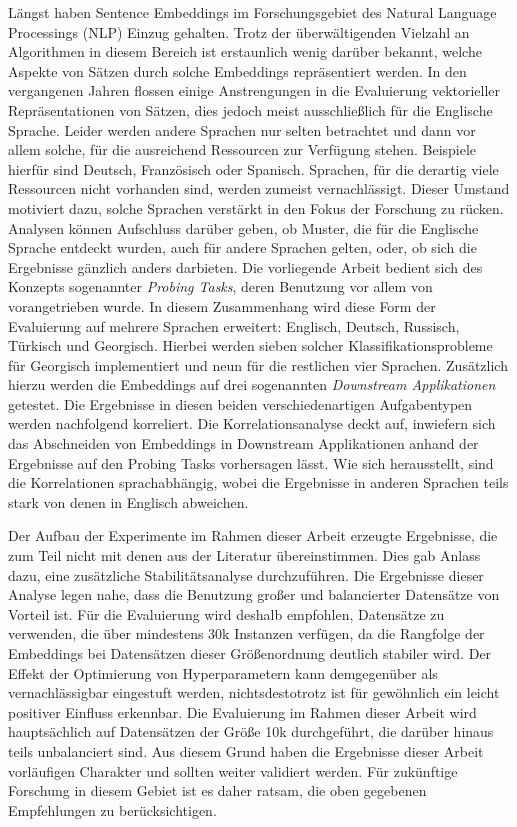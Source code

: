 Längst haben Sentence Embeddings im Forschungsgebiet des Natural Language Processings (NLP) Einzug gehalten. Trotz der überwältigenden Vielzahl an Algorithmen in diesem Bereich ist erstaunlich wenig darüber bekannt, welche Aspekte von Sätzen durch solche Embeddings repräsentiert werden. In den vergangenen Jahren flossen einige Anstrengungen in die Evaluierung vektorieller Repräsentationen von Sätzen, dies jedoch meist ausschließlich für die Englische Sprache. Leider werden andere Sprachen nur selten betrachtet und dann vor allem solche, für die ausreichend Ressourcen zur Verfügung stehen. Beispiele hierfür sind Deutsch, Französisch oder Spanisch. Sprachen, für die derartig viele Ressourcen nicht vorhanden sind, werden zumeist vernachlässigt. Dieser Umstand motiviert dazu, solche Sprachen verstärkt in den Fokus der Forschung zu rücken. Analysen können Aufschluss darüber geben, ob Muster, die für die Englische Sprache entdeckt wurden, auch für andere Sprachen gelten, oder, ob sich die Ergebnisse gänzlich anders darbieten. Die vorliegende Arbeit bedient sich des Konzepts sogenannter \textit{Probing Tasks}, deren Benutzung vor allem von \citep{Conneau.2018a} vorangetrieben wurde. In diesem Zusammenhang wird diese Form der Evaluierung auf mehrere Sprachen erweitert: Englisch, Deutsch, Russisch, Türkisch und Georgisch. Hierbei werden sieben solcher Klassifikationsprobleme für Georgisch implementiert und neun für die restlichen vier Sprachen. Zusätzlich hierzu werden die Embeddings auf drei sogenannten \textit{Downstream Applikationen} getestet. Die Ergebnisse in diesen beiden verschiedenartigen Aufgabentypen werden nachfolgend korreliert. Die Korrelationsanalyse deckt auf, inwiefern sich das Abschneiden von Embeddings in Downstream Applikationen anhand der Ergebnisse auf den Probing Tasks vorhersagen lässt. Wie sich herausstellt, sind die Korrelationen sprachabhängig, wobei die Ergebnisse in anderen Sprachen teils stark von denen in Englisch abweichen.

Der Aufbau der Experimente im Rahmen dieser Arbeit erzeugte Ergebnisse, die zum Teil nicht mit denen aus der Literatur übereinstimmen. Dies gab Anlass dazu, eine zusätzliche Stabilitätsanalyse durchzuführen. Die Ergebnisse dieser Analyse legen nahe, dass die Benutzung großer und balancierter Datensätze von Vorteil ist. Für die Evaluierung wird deshalb empfohlen, Datensätze zu verwenden, die über mindestens 30k Instanzen verfügen, da die Rangfolge der Embeddings bei Datensätzen dieser Größenordnung deutlich stabiler wird. Der Effekt der Optimierung von Hyperparametern kann demgegenüber als vernachlässigbar eingestuft werden, nichtsdestotrotz ist für gewöhnlich ein leicht positiver Einfluss erkennbar. Die Evaluierung im Rahmen dieser Arbeit wird hauptsächlich auf Datensätzen der Größe 10k durchgeführt, die darüber hinaus teils unbalanciert sind. Aus diesem Grund haben die Ergebnisse dieser Arbeit vorläufigen Charakter und sollten weiter validiert werden. Für zukünftige Forschung in diesem Gebiet ist es daher ratsam, die oben gegebenen Empfehlungen zu berücksichtigen.